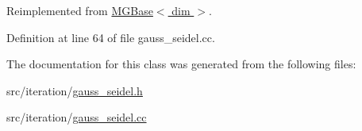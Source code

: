 Reimplemented from \hyperlink{class_m_g_base_a9d3c6ab6e58f0119badb30feedb2ac4d}{M\+G\+Base$<$ dim $>$}.



Definition at line 64 of file gauss\+\_\+seidel.\+cc.



The documentation for this class was generated from the following files\+:\begin{DoxyCompactItemize}
\item 
src/iteration/\hyperlink{gauss__seidel_8h}{gauss\+\_\+seidel.\+h}\item 
src/iteration/\hyperlink{gauss__seidel_8cc}{gauss\+\_\+seidel.\+cc}\end{DoxyCompactItemize}
